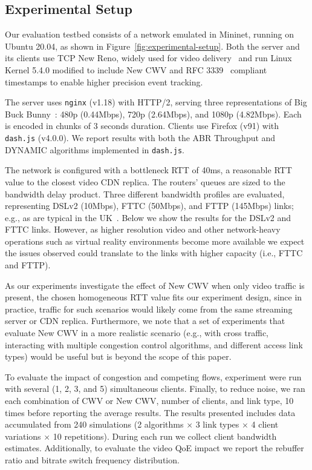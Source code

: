 \documentclass[10pt,sigconf]{acmart}
\begin{document}
\subsection{Experimental Setup}
\label{sec:experimental-setup}

Our evaluation testbed consists of a network emulated in Mininet, running on Ubuntu 20.04, as shown in Figure~\ref{fig:experimental-setup}. Both the server and its clients use TCP New Reno, widely used for video delivery~\cite{Mishra-2019-the-great-internet-tcp-congestion-control-census} and run Linux Kernel 5.4.0 modified to include New CWV and RFC 3339~\cite{rfc3339-precise-timestamps} compliant timestamps to enable higher precision event tracking. 

The server uses \texttt{nginx} (v1.18) with HTTP/2, serving three representations of Big Buck Bunny~\cite{online-bbb}: 480p (0.44Mbps), 720p (2.64Mbps), and 1080p (4.82Mbps). Each is encoded in chunks of 3 seconds duration.
Clients use Firefox (v91) with \texttt{dash.js} (v4.0.0). We
report results with both the ABR Throughput and DYNAMIC \cite{Spiteri-2019-from-theory-to-practice-sabre} algorithms implemented in \texttt{dash.js}.

The network is configured with a bottleneck RTT of 40ms, a reasonable RTT value to the closest video CDN replica. The routers' queues are sized to the bandwidth delay product. Three different bandwidth profiles are evaluated, representing DSLv2 (10Mbps), FTTC (50Mbps), and FTTP (145Mbps) links; e.g., as are typical in the UK~\cite{online-ofcom-report}. Below we show the results for the DSLv2 and FTTC links. However, as higher resolution video and other network-heavy operations such as virtual reality environments become more available we expect the issues observed could translate to the links with higher capacity (i.e., FTTC and FTTP).

As our experiments investigate the effect of New CWV when only video traffic is present, the chosen homogeneous RTT value fits our experiment design, since in practice, traffic for such scenarios would likely come from the same streaming server or CDN replica. Furthermore, we note that a set of experiments that evaluate New CWV in a more realistic scenario (e.g., with cross traffic, interacting with multiple congestion control algorithms, and different access link types) would be useful but is beyond the scope of this paper.

To evaluate the impact of congestion and competing flows, experiment were run with several (1, 2, 3, and 5) simultaneous clients. Finally, to reduce noise, we ran each combination of CWV or New CWV, number of clients, and link type, 10 times before reporting the average results. The results presented includes data accumulated from 240 simulations (2 algorithms $\times$ 3 link types $\times$ 4 client variations $\times$ 10 repetitions). 
During each run we collect client bandwidth estimates. Additionally, to evaluate the video QoE impact we report the rebuffer ratio and bitrate switch frequency distribution.
\end{document}
